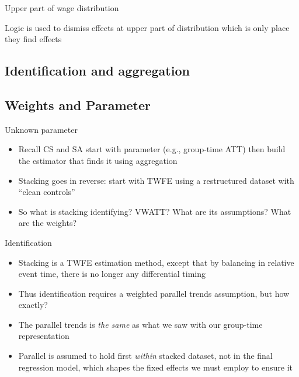 \documentclass{beamer}
\begin{document}

\begin{frame}{Upper part of wage distribution}

Logic is used to dismiss effects at upper part of distribution which is only place they find effects

\end{frame}



\subsection{Identification and aggregation}

\subsection{Weights and Parameter}

\begin{frame}{Unknown parameter}

\begin{itemize}
\item Recall CS and SA start with parameter (e.g., group-time ATT) then build the estimator that finds it using aggregation
\item Stacking goes in reverse: start with TWFE using a restructured dataset with ``clean controls''
\item So what is stacking identifying?  VWATT? What are its assumptions?  What are the weights?
\end{itemize}

\end{frame}


\begin{frame}{Identification}

\begin{itemize}
\item Stacking is a TWFE estimation method, except that by balancing in relative event time, there is no longer any differential timing
\item Thus identification requires a weighted parallel trends assumption, but how exactly?
\item The parallel trends is \emph{the same} as what we saw with our group-time representation
\item Parallel is assumed to hold first \emph{within} stacked dataset, not in the final regression model, which shapes the fixed effects we must employ to ensure it
\end{itemize}

\end{frame}
\end{document}
